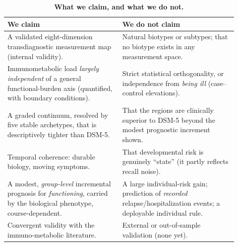 \begin{table}[hbtp]
\centering
\caption{\textbf{What we claim, and what we do not.}}
\label{tab:claims}
\renewcommand{\arraystretch}{1.3}
\begin{tabular}{p{0.46\linewidth} p{0.46\linewidth}}
\toprule
\textbf{We claim} & \textbf{We do not claim} \\
\midrule
A validated eight-dimension transdiagnostic measurement map (internal validity). &
Natural biotypes or subtypes; that no biotype exists in any measurement space. \\
Immunometabolic load \emph{largely independent} of a general functional-burden
axis (quantified, with boundary conditions). &
Strict statistical orthogonality, or independence from \emph{being ill}
(case--control elevations). \\
A graded continuum, resolved by five stable archetypes, that is descriptively
tighter than DSM-5. &
That the regions are clinically superior to DSM-5 beyond the modest prognostic
increment shown. \\
Temporal coherence: durable biology, moving symptoms. &
That developmental risk is genuinely ``state'' (it partly reflects recall noise). \\
A modest, \emph{group-level} incremental prognosis for \emph{functioning}, carried by
the biological phenotype, course-dependent. &
A large individual-risk gain; prediction of \emph{recorded} relapse/hospitalization
events; a deployable individual rule. \\
Convergent validity with the immuno-metabolic literature. &
External or out-of-sample validation (none yet). \\
\bottomrule
\end{tabular}
\end{table}
